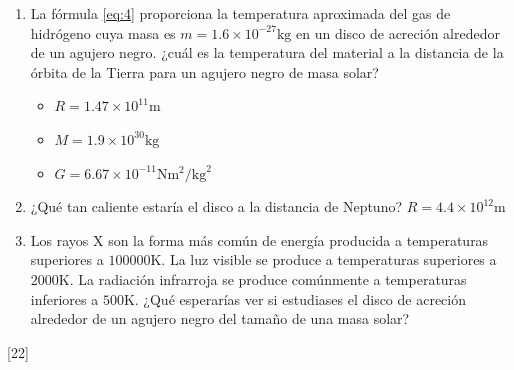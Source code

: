 \documentclass[a4paper]{article}
\newcommand{\m}{\text{m}}
\newcommand{\N}{\text{N}}
\newcommand{\kg}{\text{kg}}
\newcommand{\K}{\text{K}}
\newcounter{problema}
\begin{document}
\begin{problema}
\begin{enumerate}
	\item La fórmula \eqref{eq:4} proporciona la temperatura aproximada del gas de hidrógeno cuya masa es $m = 1.6 \times 10^{-27} \kg$ en un disco de acreción alrededor de un agujero negro. 
	¿cuál es la temperatura del material a la distancia de la órbita de la Tierra para un agujero negro de masa solar?
	\begin{itemize}
		\item $R = 1.47 \times 10^{11} \m$
		\item $M = 1.9 \times 10^{30} \kg$
		\item $G = 6.67 \times 10^{-11} \N \m ^2/\kg^2$
	\end{itemize}
	\item ¿Qué tan caliente estaría el disco a la distancia de Neptuno? $R = 4.4 \times 10^{12} \m$
	\item Los rayos X son la forma más común de energía producida a temperaturas superiores a $100 000 \K$. La luz visible se produce a temperaturas superiores a $2 000 \K$. 
	La radiación infrarroja se produce comúnmente a temperaturas inferiores a $500 \K$. ¿Qué esperarías ver si estudiases el disco de acreción alrededor de un agujero negro del tamaño de una masa solar?
\end{enumerate}
\end{problema}
[22] \cite{NASA_BlackHoleMath}



\end{document}
